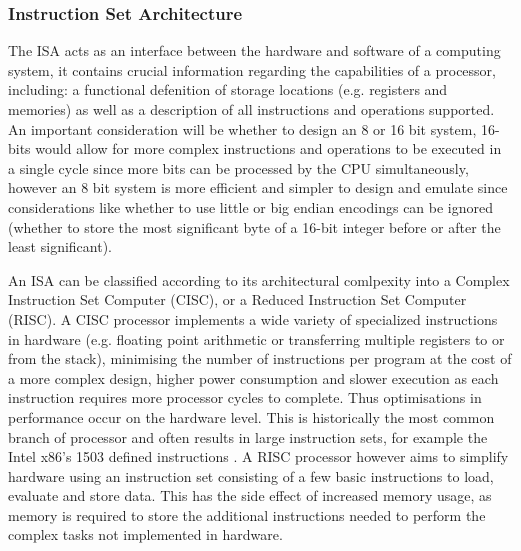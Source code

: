 \subsubsection{Instruction Set Architecture}
\label{sec:ISA}
The ISA acts as an interface between the hardware and software of a computing system, it contains crucial information regarding the capabilities of a processor, including: a functional defenition of storage locations (e.g. registers and memories) as well as a description of all instructions and operations supported. An important consideration will be whether to design an 8 or 16 bit system, 16-bits would allow for more complex instructions and operations to be executed in a single cycle since more bits can be processed by the CPU simultaneously, however an 8 bit system is more efficient and simpler to design and emulate since considerations like whether to use little or big endian encodings can be ignored (whether to store the most significant byte of a 16-bit integer before or after the least significant).

An ISA can be classified according to its architectural comlpexity into a Complex Instruction Set Computer (CISC), or a Reduced Instruction Set Computer (RISC). A CISC processor implements a wide variety of specialized instructions in hardware (e.g. floating point arithmetic or transferring multiple registers to or from the stack), minimising the number of instructions per program at the cost of a more complex design, higher power consumption and slower execution as each instruction requires more processor cycles to complete. \textcite{gfg-risc-vs-cisc} Thus optimisations in performance occur on the hardware level. This is historically the most common branch of processor and often results in large instruction sets, for example the Intel x86's 1503 defined instructions \textcite{ryg-blog}. A RISC processor however aims to simplify hardware using an instruction set consisting of a few basic instructions to load, evaluate and store data. This has the side effect of increased memory usage, as memory is required to store the additional instructions needed to perform the complex tasks not implemented in hardware.

